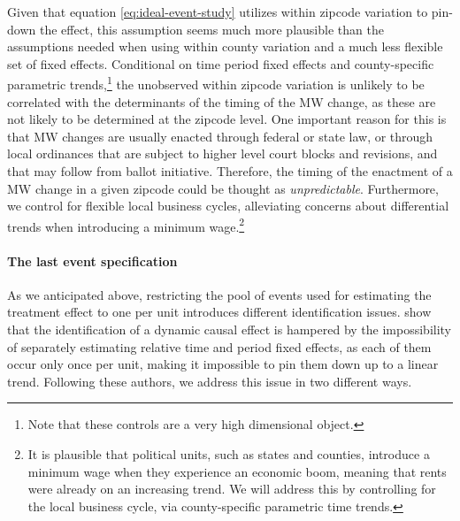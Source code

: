     Given that equation \eqref{eq:ideal-event-study} utilizes within zipcode variation to pin-down the effect, this assumption seems much more plausible than the assumptions needed when using within county variation and a much less flexible set of fixed effects. Conditional on time period fixed effects and county-specific parametric trends,\footnote{Note that these controls are a very high dimensional object.} the unobserved within zipcode variation is unlikely to be correlated with the determinants of the timing of the MW change, as these are not likely to be determined at the zipcode level. One important reason for this is that MW changes are usually enacted through federal or state law, or through local ordinances that are subject to higher level court blocks and revisions, and that may follow from ballot initiative. Therefore, the timing of the enactment of a MW change in a given zipcode could be thought as \textit{unpredictable}.
    Furthermore, we control for flexible local business cycles, alleviating concerns about differential trends when introducing a minimum wage.\footnote{It is plausible that political units, such as states and counties, introduce a minimum wage when they experience an economic boom, meaning that rents were already on an increasing trend. We will address this by controlling for the local business cycle, via county-specific parametric time trends.}
    
    \paragraph{The last event specification}
    
    As we anticipated above, restricting the pool of events used for estimating the treatment effect to one per unit introduces different identification issues. \textcite{BorusyakJaravel2017} show that the identification of a dynamic causal effect is hampered by the impossibility of separately estimating relative time and period fixed effects, as each of them occur only once per unit, making it impossible to pin them down up to a linear trend. Following these authors, we address this issue in two different ways.
    
